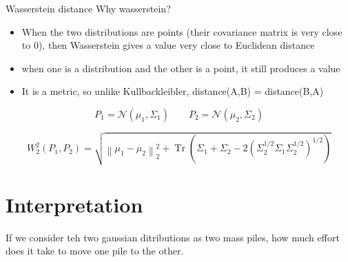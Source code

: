 \begin{frame}{Wasserstein distance}
    Why wasserstein?
    \begin{itemize}
        \item When the two distributions are points (their covariance matrix is very close to 0), then Wasserstein gives a value very close to Euclidean distance
        \item when one is a distribution and the other is a point, it still produces a value
        \item It is a metric, so unlike Kullbackleibler, distance(A,B) = distance(B,A)
    \end{itemize}
    \[
        P_1
        =
        \mathcal{N}
        \left(
            \mu_1,
            \Sigma_1
        \right)
        \qquad
        P_2
        =
        \mathcal{N}
        \left(
            \mu_2,
            \Sigma_2
        \right)
    \]
    
    \[
        W_2^2
        \left(
            P_1,
            P_2
        \right)
        =
        \sqrt{
            \left\lVert
                \mu_1 - \mu_2
            \right\rVert_2^2
            +
            \operatorname{Tr}
            \left(
                \Sigma_1
            +
                \Sigma_2
            -
            2
                \left(
                    \Sigma_2^{1/2}
                    \Sigma_1
                    \Sigma_2^{1/2}
                \right)^{1/2}
            \right)}
    \]
    
    
    \section{Interpretation}
        If we consider teh two gaussian ditributions as two mass piles, how much effort does it take to move one pile to the other.
\end{frame}